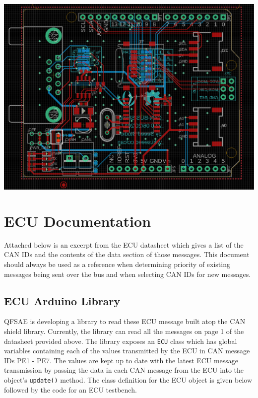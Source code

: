 \documentclass[letterpaper]{article}
\begin{document}
\begin{center}
  \includegraphics[width=\textwidth]{terminating-resistor}
\end{center}

\section{ECU Documentation}
Attached below is an excerpt from the ECU datasheet which
gives a list of the CAN IDs and the contents of the data section of those
messages. This document should always be used as a reference when determining
priority of existing messages being sent over the bus and when selecting CAN IDs
for new messages.\\



\subsection{ECU Arduino Library}
QFSAE is developing a library to read these ECU message built atop the
CAN shield library. Currently, the library can read all the messages on page 1
of the datasheet provided above. The library exposes an \lstinline{ECU} class
which has global variables containing each of the values transmitted by
the ECU in CAN message IDs PE1 - PE7. The values are kept up to date with the
latest ECU message transmission by passing the data in each CAN message from the
ECU into the object's \lstinline{update()} method. The class definition for the
ECU object is given below followed by the code for an ECU testbench.\\
\end{document}
